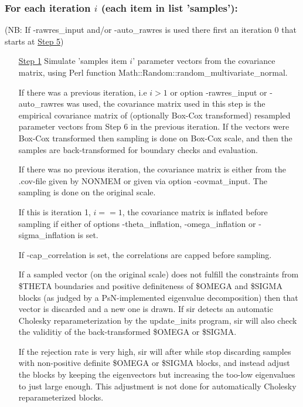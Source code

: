 \subsubsection*{For each iteration $i$ (each item in list 'samples'):}
(NB: If -rawres\_input and/or -auto\_rawres is used there first an iteration 0 that starts at \underline{Step 5})
\begin{itemize}
\item[\underline{Step 1}] 
Simulate 'samples item $i$' parameter vectors from the 
covariance matrix, using Perl function Math::Random::random\_multivariate\_normal.

\noindent If there was a previous iteration, i.e $i>1$ or option -rawres\_input or -auto\_rawres was used, 
the covariance matrix used in this step is the
empirical covariance matrix of (optionally Box-Cox transformed) resampled parameter vectors from
Step 6 in the previous iteration. 
If the vectors were Box-Cox transformed then
sampling is done on Box-Cox scale, and 
then the samples are back-transformed for boundary checks and evaluation.

\noindent If there was no previous iteration, the covariance matrix is either from
the .cov-file given by NONMEM or given via option -covmat\_input.
The sampling is done on the original scale. 

\noindent If this is iteration 1, $i==1$, 
the covariance matrix is inflated before sampling 
if either of options -theta\_inflation, -omega\_inflation or -sigma\_inflation is set.

\noindent If -cap\_correlation is set, the correlations are capped before sampling.

\noindent If a sampled vector (on the original scale) does not fulfill the constraints from \$THETA boundaries
and positive definiteness of \$OMEGA and
\$SIGMA blocks (as judged by a PsN-implemented eigenvalue decomposition) 
then that vector is 
discarded and a new one is drawn. If sir detects an automatic Cholesky reparameterization
by the update\_inits program, sir will also check the validitiy of the back-transformed \$OMEGA or \$SIGMA.

\noindent If the rejection rate is very high, sir will after while stop discarding samples with non-positive definite
\$OMEGA or \$SIGMA blocks, and instead adjust the blocks by
keeping the eigenvectors but increasing the too-low eigenvalues to just large enough.
This adjustment is not done for automatically Cholesky reparameterized blocks.


\end{itemize}
